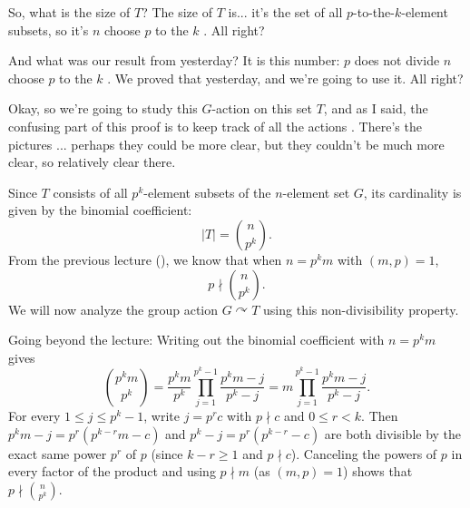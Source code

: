 \begin{proofWrapper}
\begin{speech}[00:05:46 - 00:06:39]
So, what is the size of $T$? The size of $T$ is... it's the set of all $p$-to-the-$k$-element subsets, so it's $n$ choose $p$ to the $k$ . All right?

And what was our result from yesterday? It is this number: $p$ does not divide $n$ choose $p$ to the $k$ . We proved that yesterday, and we're going to use it. All right?

Okay, so we're going to study this $G$-action on this set $T$, and as I said, the confusing part of this proof is to keep track of all the actions . There's the pictures ... perhaps they could be more clear, but they couldn't be much more clear, so relatively clear there.
\end{speech}

\begin{content}
Since $T$ consists of all $p^k$-element subsets of the $n$-element set $G$, its cardinality is given by the binomial coefficient:
\begin{equation}\label{eq:T-cardinality}
|T| = \binom{n}{p^k}.
\end{equation}
From the previous lecture (), we know that when $n = p^k m$ with $(m, p) = 1$,
\begin{equation}\label{eq:p-not-div-binom}
p \nmid \binom{n}{p^k}.
\end{equation}
We will now analyze the group action $G \curvearrowright T$ using this non-divisibility property.

\begin{steps}
Going beyond the lecture: Writing out the binomial coefficient with $n = p^k m$ gives
\[
\binom{p^k m}{p^k} = \frac{p^k m}{p^k} \prod_{j=1}^{p^k - 1} \frac{p^k m - j}{p^k - j} = m \prod_{j=1}^{p^k - 1} \frac{p^k m - j}{p^k - j}.
\]
For every $1 \le j \le p^k - 1$, write $j = p^r c$ with $p \nmid c$ and $0 \le r < k$. Then $p^k m - j = p^r (p^{k-r} m - c)$ and $p^k - j = p^r (p^{k-r} - c)$ are both divisible by the exact same power $p^r$ of $p$ (since $k - r \ge 1$ and $p \nmid c$). Canceling the powers of $p$ in every factor of the product and using $p \nmid m$ (as $(m, p) = 1$) shows that $p \nmid \binom{n}{p^k}$.
\end{steps}
\end{content}


\end{proofWrapper}
